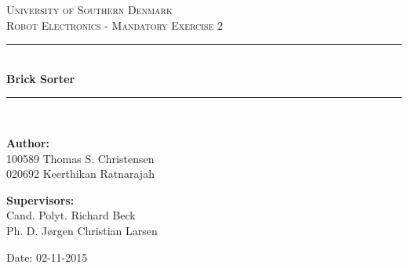 \begin{titlepage}
\begin{center}

\textsc{\LARGE University of Southern Denmark}\\[1.5cm]
\textsc{\large Robot Electronics - Mandatory Exercise 2}\\[0.5cm]
\vfill
\hrule ~\\[0.3cm]
{ \huge \bfseries Brick Sorter\\[0.4cm] }
\hrule ~\\[1.5cm]
\vfill

\begin{minipage}[t]{.49\textwidth}
\begin{flushleft} \large
\textbf{Author:}\\
100589 Thomas S. Christensen \\
020692 Keerthikan Ratnarajah\\
\end{flushleft}
\end{minipage}
\begin{minipage}[t]{.49\textwidth}
\begin{flushright} \large
\textbf{Supervisors:} \\
Cand. Polyt. Richard Beck\\
Ph. D. Jørgen Christian Larsen
\end{flushright}
\end{minipage}

\vspace{1.2cm}
Date: 02-11-2015

\end{center}
\end{titlepage}